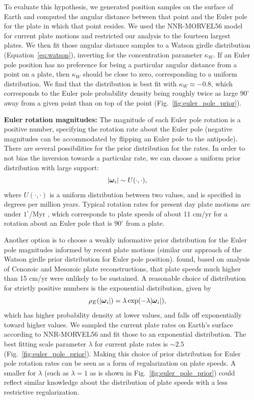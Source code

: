 \documentclass[11pt,letterpaper]{article}
\newcommand{\mitbf}[1]{\hbox{\mathversion{bold}$#1$}}
\begin{document}
To evaluate this hypothesis, we generated position samples on the surface of Earth and computed the angular distance between that point and the Euler pole for the plate in which that point resides. We used the NNR-MORVEL56 model for current plate motions \citep{Argus2011a} and restricted our analysis to the fourteen largest plates. We then fit those angular distance samples to a Watson girdle distribution (Equation~\eqref{eq:watson}),  inverting for the concentration parameter $\kappa_W$. If an Euler pole position has no preference for being a particular angular distance from a point on a plate, then $\kappa_W$ should be close to zero, corresponding to a uniform distribution. We find that the distribution is best fit with $\kappa_W \approx -0.8$, which corresponds to the Euler pole probability density being roughly twice as large $90^\circ$ away from a given point than on top of the point (Fig.~\ref{fig:euler_pole_prior}).

\textbf{Euler rotation magnitudes:} 
The magnitude of each Euler pole rotation is a positive number, specifying the rotation rate about the Euler pole (negative magnitudes can be accommodated by flipping an Euler pole to the antipode). There are several possibilities for the prior distribution for the rates. In order to not bias the inversion towards a particular rate, we can choose a uniform prior distribution with large support:
\begin{equation}
\vert \mitbf{\omega}_i \vert \sim U(\cdot, \cdot),
\end{equation}
where $U(\cdot, \cdot)$ is a uniform distribution between two values, and is specified in degrees per million years. Typical rotation rates for present day plate motions are under $1^\circ$/Myr \citep{Argus2011a}, which corresponds to plate speeds of about 11 cm/yr for a rotation about an Euler pole that is $90^\circ$ from a plate.

Another option is to choose a weakly informative prior distribution for the Euler pole magnitudes informed by recent plate motions (similar our approach of the Watson girdle prior distribution for Euler pole position). \cite{Zahirovic2015a} found, based on analysis of Cenozoic and Mesozoic plate reconstructions, that plate speeds much higher than 15 cm/yr were unlikely to be sustained. A reasonable choice of distribution for strictly positive numbers is the exponential distribution, given by
\begin{equation}
\rho_E(\vert \mitbf{\omega}_i \vert) = \lambda \exp(-\lambda \vert \mitbf{\omega}_i \vert),
\end{equation}
which has higher probability density at lower values, and falls off exponentially toward higher values. We sampled the current plate rates on Earth's surface according to NNR-MORVEL56 and fit those to an exponential distribution. The best fitting scale parameter $\lambda$ for current plate rates is $\sim2.5$ (Fig.~\ref{fig:euler_pole_prior}). Making this choice of prior distribution for Euler pole rotation rates can be seen as a form of regularization on plate speeds. A smaller for $\lambda$ (such as $\lambda =1$ as is shown in Fig.~\ref{fig:euler_pole_prior}) could reflect similar knowledge about the distribution of plate speeds with a less restrictive regularization.
\end{document}
